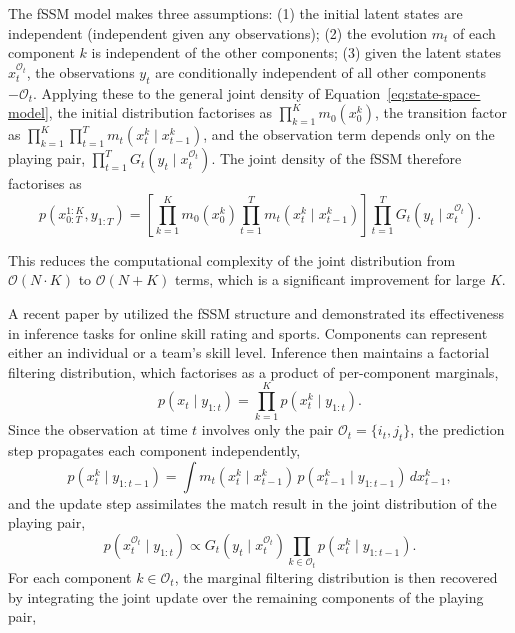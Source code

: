 The fSSM model makes three assumptions: (1) the initial latent states are  independent (independent given any observations); (2) the evolution $m_t$ of each component $k$ is independent of the other components; (3) given the latent states $x_t^{\mathcal{O}_t}$, the observations $y_t$ are conditionally independent of all other components $-\mathcal{O}_t$. Applying these to the general joint density of Equation~\eqref{eq:state-space-model}, the initial distribution factorises as $\prod_{k=1}^K m_0(x_0^k)$, the transition factor as $\prod_{k=1}^K\prod_{t=1}^T m_t(x_t^k \mid x_{t-1}^k)$, and the observation term depends only on the playing pair, $\prod_{t=1}^T G_t(y_t \mid x_t^{\mathcal{O}_t})$. The joint density of the fSSM therefore factorises as
\begin{equation}
\label{eq:factorial-joint}
p(x_{0:T}^{1:K}, y_{1:T}) = \left[ \prod_{k=1}^K m_0(x_0^k) \prod_{t=1}^T m_t(x_t^k \mid x_{t-1}^k) \right] \prod_{t=1}^T G_t(y_t \mid x_t^{\mathcal{O}_t}).
\end{equation}

This reduces the computational complexity of the joint distribution from $\mathcal{O}(N \cdot K)$ to $\mathcal{O}(N + K)$ terms, which is a significant improvement for large $K$.

A recent paper by \citet{duffieldpowerrimella2024factorialssm} utilized the fSSM structure and demonstrated its effectiveness in inference tasks for online skill rating and sports. Components can represent either an individual or a team's skill level. Inference then maintains a factorial filtering distribution, which factorises as a product of per-component marginals,
\begin{equation}
\label{eq:factorial-filter}
p(x_t \mid y_{1:t}) = \prod_{k=1}^K p(x_t^k \mid y_{1:t}).
\end{equation}
Since the observation at time $t$ involves only the pair $\mathcal{O}_t = \{i_t, j_t\}$, the prediction step propagates each component independently,
\begin{equation}
p(x_t^k \mid y_{1:t-1}) = \int m_t(x_t^k \mid x_{t-1}^k) \, p(x_{t-1}^k \mid y_{1:t-1}) \, dx_{t-1}^k,
\end{equation}
and the update step assimilates the match result in the joint distribution of the playing pair,
\begin{equation}
p(x_t^{\mathcal{O}_t} \mid y_{1:t}) \propto G_t(y_t \mid x_t^{\mathcal{O}_t}) \prod_{k \in \mathcal{O}_t} p(x_t^k \mid y_{1:t-1}).
\end{equation}
For each component $k \in \mathcal{O}_t$, the marginal filtering distribution is then recovered by integrating the joint update over the remaining components of the playing pair,

